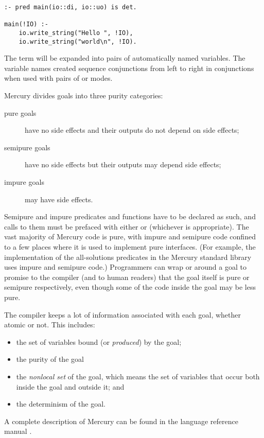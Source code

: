 \begin{verbatim}
:- pred main(io::di, io::uo) is det.

main(!IO) :-
    io.write_string("Hello ", !IO),
    io.write_string("world\n", !IO).
\end{verbatim}

\noindent
The term  will be expanded into pairs of automatically named
variables.
The variable names created sequence conjunctions from left to right in
conjunctions when used with pairs of  or 
modes.

\label{page:purity}
Mercury divides goals into three purity categories:

\begin{description}

    \item[pure goals] have no side effects
    and their outputs do not depend on side effects;

    \item[semipure goals] have no side effects
    but their outputs may depend side effects;

    \item[impure goals] may have side effects.

\end{description}

\noindent
Semipure and impure predicates and functions
have to be declared as such,
and calls to them must be prefaced with either
 or  (whichever is appropriate).
The vast majority of Mercury code is pure,
with impure and semipure code confined to a few places
where it is used to implement pure interfaces.
(For example, the implementation of the all-solutions predicates
in the Mercury standard library uses impure and semipure code.)
Programmers can wrap
 or  around a goal
to promise to the compiler (and to human readers) that
the goal itself is pure or semipure respectively,
even though some of the code inside the goal may be less pure.

The compiler keeps a lot of information associated with each goal,
whether atomic or not.
This includes:

\begin{itemize}
\item
the set of variables bound (or \emph{produced}) by the goal;
\item
the purity of the goal
\item
the \emph{nonlocal set} of the goal,
which means the set of variables
that occur both inside the goal and outside it; and
\item
the determinism of the goal.
\end{itemize}

\noindent
A complete description of Mercury
can be found in the language reference manual \citep{mercury_refman}.

